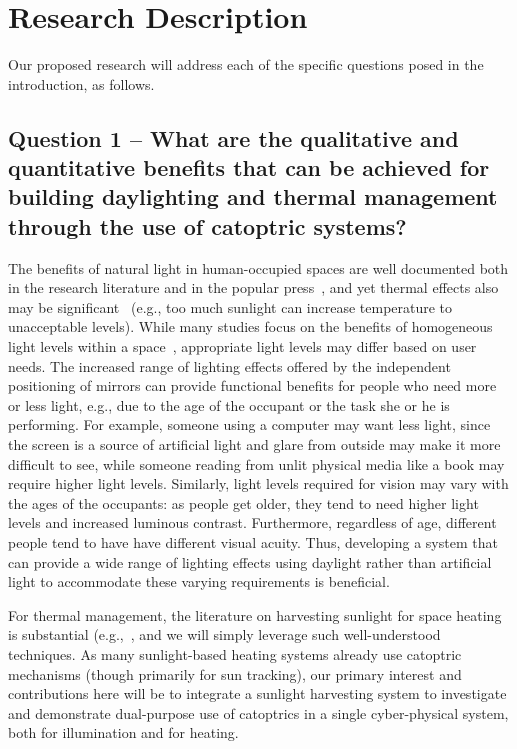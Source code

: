 \section{Research Description}
\label{sec:research}

Our proposed research will address each of the specific questions posed in 
the introduction, as follows.

\subsection{Question 1 -- What are the qualitative and quantitative benefits
that can be achieved for building daylighting and thermal management
through the use of catoptric systems?}

The benefits of natural light in human-occupied spaces are well
documented both in the research literature and in the popular
press~\cite{hhm15,Leslie03,ll01,Libby03,pce00,vandenW14},
and yet thermal effects also may be significant~\cite{bmbc13} 
(e.g., too much sunlight can increase temperature to unacceptable levels).
While many studies focus on the benefits of homogeneous light levels within a space~\cite{azaise13,bwkk15,gb16}, appropriate light levels may differ based on user needs.
The increased range of lighting effects offered by the independent positioning of mirrors
can provide functional benefits for people who need more or less
light, e.g., due to the age of the occupant or the task she or he is performing. For 
example, someone using a computer may want less light, since the screen is a source of
artificial light and glare from outside may make it more difficult to see, while 
someone reading from unlit physical media like a book may require higher light levels. 
Similarly, light levels required for vision may vary with the ages of the occupants: as 
people get older, they tend to need higher light levels and increased luminous contrast. 
Furthermore, regardless of age, different people tend to have have different visual 
acuity. Thus, developing a system that can provide a wide range of lighting effects 
using daylight rather than artificial light to accommodate these varying requirements is beneficial.

For thermal management, the literature on harvesting sunlight for
space heating is substantial (e.g.,~\cite{deW75,Hunt79,kbd76,Lunde80,smf08,wo06}, 
and we will simply leverage such well-understood techniques. As many sunlight-based
heating systems already use catoptric mechanisms (though primarily for sun
tracking), our primary interest and contributions here will be to
integrate a sunlight harvesting system to investigate and demonstrate
dual-purpose use of catoptrics in a single cyber-physical system, both
for illumination and for heating.


